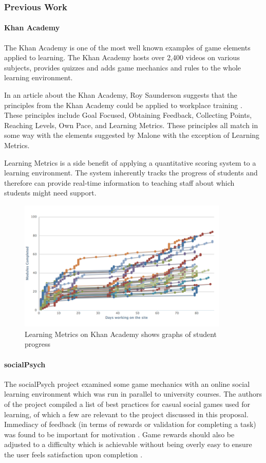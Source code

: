 \subsubsection{Previous Work}
\paragraph{Khan Academy}
The Khan Academy\cite{_khan_????} is one of the most well known examples of
game elements applied to learning. The Khan Academy hosts over 2,400 videos on various
subjects, provides quizzes and adds game mechanics and rules to the whole learning environment.

In an article about the Khan Academy, Roy Saunderson suggests that the principles
from the Khan Academy could be applied to workplace training \cite{saunderson_making_2011}.
These principles include Goal Focused, Obtaining Feedback, Collecting Points, Reaching
Levels, Own Pace, and Learning Metrics. These principles all match 
in some way with the elements suggested by Malone\cite{malone_what_1980} with
the exception of Learning Metrics.

Learning Metrics is a side benefit of applying a
quantitative scoring system to a learning environment. The system inherently
tracks the progress of students and therefore can provide real-time information
to teaching staff about which students might need support.

\begin{figure}[h]
	\centering
		\includegraphics[width=10cm]{./khan.png}    
		\caption{Learning Metrics on Khan Academy shows graphs of student progress}
\end{figure}

\paragraph{socialPsych}
The socialPsych\cite{landers_casual_2011} project examined some game mechanics
with an online social learning environment which was run in parallel to university
courses. The authors of the project compiled a list of best practices
for casual social games used for learning, of which a few are relevant to
the project discussed in this proposal. Immediacy of feedback (in terms of
rewards or validation for completing a task) was found to be important for
motivation \cite[p. 419]{landers_casual_2011}. Game rewards should also be adjusted
to a difficulty which is achievable without being overly easy to ensure the user
feels satisfaction upon completion \cite[p. 420]{landers_casual_2011}.

